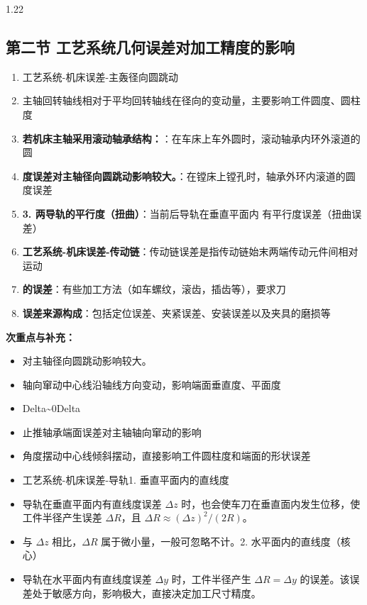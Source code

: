 \documentclass[12pt,a4paper]{article}
\begin{document}
\begin{spacing}{1.22}
\subsection{第二节 工艺系统几何误差对加工精度的影响}
\begin{tcolorbox}[colback=yellow!6,colframe=red!55!black,title=重点,left=1mm,right=1mm]
\begin{enumerate}[leftmargin=2.2em,label=\arabic*.]
  \item 工艺系统-机床误差-主轰径向圆跳动
  \item 主轴回转轴线相对于平均回转轴线在径向的变动量，主要影响工件圆度、圆柱度
  \item \textbf{若机床主轴采用滚动轴承结构：}：在车床上车外圆时，滚动轴承内环外滚道的圆
  \item \textbf{度误差对主轴径向圆跳动影响较大。}：在镗床上镗孔时，轴承外环内滚道的圆度误差
  \item \textbf{3. 两导轨的平行度（扭曲）}：当前后导轨在垂直平面内 有平行度误差（扭曲误差）
  \item \textbf{工艺系统-机床误差-传动链}：传动链误差是指传动链始末两端传动元件间相对运动
  \item \textbf{的误差}：有些加工方法（如车螺纹，滚齿，插齿等），要求刀
  \item \textbf{误差来源构成}：包括定位误差、夹紧误差、安装误差以及夹具的磨损等
\end{enumerate}
\end{tcolorbox}
\noindent\textbf{次重点与补充：}
\begin{itemize}[leftmargin=2.2em,label=--]
  \item 对主轴径向圆跳动影响较大。
  \item 轴向窜动中心线沿轴线方向变动，影响端面垂直度、平面度
  \item Delta\textasciitilde{}0Delta
  \item 止推轴承端面误差对主轴轴向窜动的影响
  \item 角度摆动中心线倾斜摆动，直接影响工件圆柱度和端面的形状误差
  \item 工艺系统-机床误差-导轨1. 垂直平面内的直线度
  \item 导轨在垂直平面内有直线度误差 $\Delta z$ 时，也会使车刀在垂直面内发生位移，使工件半径产生误差 $\Delta R$，且 $\Delta R\approx(\Delta z)^2/(2R)$。
  \item 与 $\Delta z$ 相比，$\Delta R$ 属于微小量，一般可忽略不计。2. 水平面内的直线度（核心）
  \item 导轨在水平面内有直线度误差 $\Delta y$ 时，工件半径产生 $\Delta R=\Delta y$ 的误差。该误差处于敏感方向，影响极大，直接决定加工尺寸精度。

\end{itemize}
\end{spacing}
\end{document}
